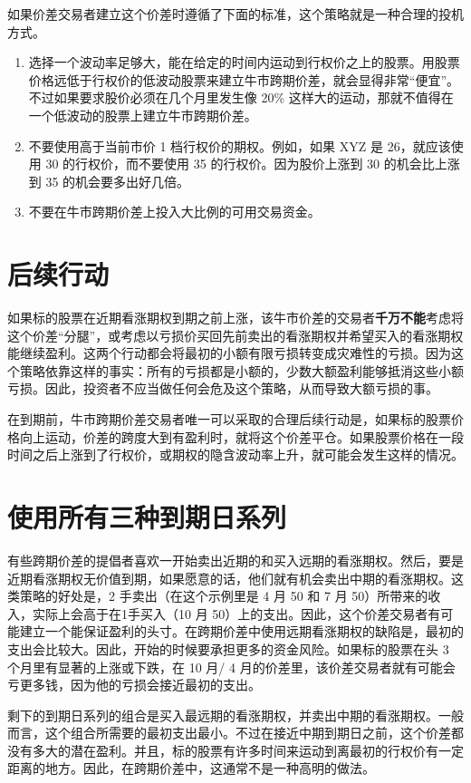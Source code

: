 \documentclass{article}
\begin{document}
如果价差交易者建立这个价差时遵循了下面的标准，这个策略就是一种合理的投机方式。
\begin{enumerate}
    \item 选择一个波动率足够大，能在给定的时间内运动到行权价之上的股票。用股票价格远低于行权价的低波动股票来建立牛市跨期价差，就会显得非常“便宜”。不过如果要求股价必须在几个月里发生像 20\% 这样大的运动，那就不值得在一个低波动的股票上建立牛市跨期价差。
    \item 不要使用高于当前市价 1 档行权价的期权。例如，如果 XYZ 是 26，就应该使用 30 的行权价，而不要使用 35 的行权价。因为股价上涨到 30 的机会比上涨到 35 的机会要多出好几倍。
    \item 不要在牛市跨期价差上投入大比例的可用交易资金。
\end{enumerate}
\section{后续行动}
如果标的股票在近期看涨期权到期之前上涨，该牛市价差的交易者\textbf{千万不能}考虑将这个价差“分腿”，或考虑以亏损价买回先前卖出的看涨期权并希望买入的看涨期权能继续盈利。这两个行动都会将最初的小额有限亏损转变成灾难性的亏损。因为这个策略依靠这样的事实：所有的亏损都是小额的，少数大额盈利能够抵消这些小额亏损。因此，投资者不应当做任何会危及这个策略，从而导致大额亏损的事。

在到期前，牛市跨期价差交易者唯一可以采取的合理后续行动是，如果标的股票价格向上运动，价差的跨度大到有盈利时，就将这个价差平仓。如果股票价格在一段时间之后上涨到了行权价，或期权的隐含波动率上升，就可能会发生这样的情况。
\section{使用所有三种到期日系列}
有些跨期价差的提倡者喜欢一开始卖出近期的和买入远期的看涨期权。然后，要是近期看涨期权无价值到期，如果愿意的话，他们就有机会卖出中期的看涨期权。这类策略的好处是，2 手卖出（在这个示例里是 4 月 50 和 7 月 50）所带来的收入，实际上会高于在1手买入（10 月 50）上的支出。因此，这个价差交易者有可能建立一个能保证盈利的头寸。在跨期价差中使用远期看涨期权的缺陷是，最初的支出会比较大。因此，开始的时候要承担更多的资金风险。如果标的股票在头 3 个月里有显著的上涨或下跌，在 10 月/ 4 月的价差里，该价差交易者就有可能会亏更多钱，因为他的亏损会接近最初的支出。

剩下的到期日系列的组合是买入最远期的看涨期权，并卖出中期的看涨期权。一般而言，这个组合所需要的最初支出最小。不过在接近中期到期日之前，这个价差都没有多大的潜在盈利。并且，标的股票有许多时间来运动到离最初的行权价有一定距离的地方。因此，在跨期价差中，这通常不是一种高明的做法。
\end{document}
